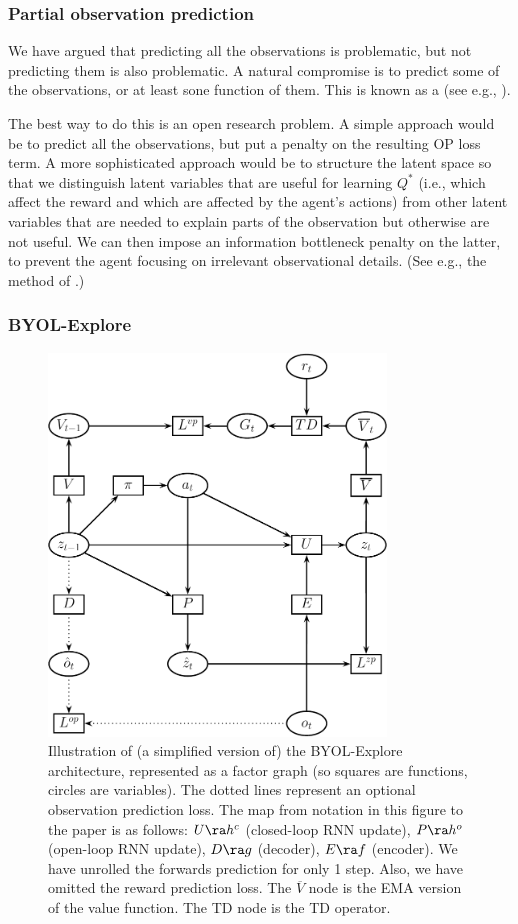 \subsubsection{Partial observation prediction}

We have argued that predicting all the observations
is problematic, but not predicting them is also problematic.
A natural compromise is to predict some of the observations,
or at least sone function of them.
This is known as a 
(see e.g., \citep{Alver2023}).

The best way to do this is an open research problem.
A simple approach would be to predict all the observations,
but put a penalty on the resulting OP loss term.
A more sophisticated approach would be to structure the latent
space so that we distinguish latent variables
that are useful for learning $Q^*$ (i.e., which affect the reward
and which are affected by the agent's actions)
from other latent variables that are needed to explain
parts of the observation but otherwise are not useful.
We can then impose an  information bottleneck
penalty on the latter, to prevent the agent
focusing on irrelevant observational details.
(See e.g., the  method
of \citep{Wang2022}.)


\subsubsection{BYOL-Explore}
\label{sec:BYOL}

\begin{figure}
\centering
\includegraphics[height=4in]{figs/byol2}
\caption{
  Illustration of (a simplified version of)  the BYOL-Explore architecture,
  represented as a factor graph
  (so squares are functions, circles are variables).
  The dotted lines represent an optional observation
  prediction loss.
  The map from notation in this figure to the paper is as follows:
  $U \ra h^c$ (closed-loop RNN update),
  $P \ra h^o$ (open-loop RNN update),
  $D \ra g$ (decoder),
  $E \ra f$ (encoder).
  We have unrolled the forwards prediction for only 1 step.
  Also, we have omitted the reward prediction loss.
  The $\overline{V}$ node is the EMA version of the value function.
  The TD node is the TD operator.
}
\label{fig:byol}
\end{figure}

